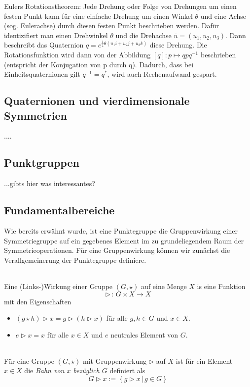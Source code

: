 Eulers Rotationstheorem: Jede Drehung oder Folge von Drehungen um einen festen Punkt kann für eine einfache Drehung um einen Winkel $\theta$ und eine Achse (sog. Eulerachse) durch diesen festen Punkt beschrieben werden. Dafür identizifiert man einen 
Drehwinkel $\theta$ und die Drehachse $\overline{u} = (u_1,u_2,u_3)$.
Dann beschreibt das Quaternion $q = e^{\frac{1}{2}\theta(u_1i + u_2j + u_3k)}$ diese Drehung.
Die Rotationsfunktion wird dann von der Abbildung $[q]: p \mapsto q p q^{-1}$ beschrieben (entspricht der Konjugation von p durch q).
Dadurch, dass bei Einheitsquaternionen gilt $q^{-1} = q^*$, wird auch Rechenaufwand gespart.

\subsection{Quaternionen und vierdimensionale Symmetrien}
....

\subsection{Punktgruppen}
...gibts hier was interessantes?

\subsection{Fundamentalbereiche}\label{fundamentalbereich}

Wie bereits erwähnt wurde, ist eine Punktegruppe die Gruppenwirkung einer Symmetriegruppe auf ein gegebenes Element im zu grundeliegendem Raum der Symmetrieoperationen.
Für eine Gruppenwirkung können wir zunächst die Verallgemeinerung der Punktegruppe definiere.

\begin{definition}[Gruppenwirkung]\label{fundamentalbereich:wirking} \mbox{}\\
 Eine (Links-)Wirkung einer Gruppe $(G, \star)$ auf eine Menge $X$ is eine Funktion
   $$
      \rhd \, : \, G \times X \longrightarrow X
   $$
   mit den Eigenschaften
   \begin{itemize}
      \item $(g \star h) \rhd x = g \rhd (h \rhd x)$ für alle $g,h \in G$ und $x \in X$.
      \item $e \rhd x = x$ für alle $x \in X$ und $e$ neutrales Element von $G$.
   \end{itemize}
\end{definition}

\begin{definition}[Orbit] \label{fundamentalbereich:orbit} \mbox{}\\
  Für eine Gruppe $(G, \star)$ mit Gruppenwirkung $\rhd$ auf $X$ ist für ein Element $x \in X$ die \emph{Bahn von $x$ bezüglich $G$} definiert als
   $$
      G \rhd x := \left\{ g \rhd x \, | \, g \in G \right\}
   $$
\end{definition}

